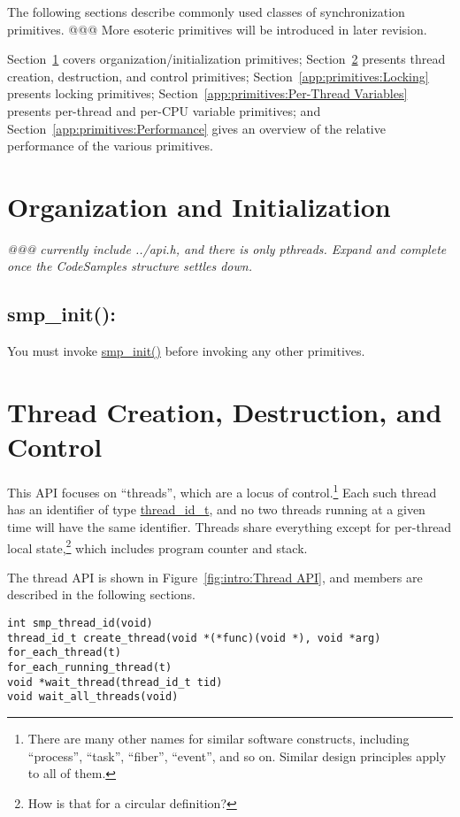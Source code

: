 The following sections describe commonly used classes of synchronization
primitives.
@@@ More esoteric primitives will be introduced in later revision.

Section~\ref{app:primitives:Organization and Initialization}
covers organization/initialization primitives;
Section~\ref{app:primitives:Thread Creation, Destruction, and Control}
presents thread creation, destruction, and control primitives;
Section~\ref{app:primitives:Locking}
presents locking primitives;
Section~\ref{app:primitives:Per-Thread Variables}
presents per-thread and per-CPU variable primitives; and
Section~\ref{app:primitives:Performance}
gives an overview of the relative performance of the various primitives.

\section{Organization and Initialization}
\label{app:primitives:Organization and Initialization}

\emph{@@@ currently include ../api.h, and there is only pthreads.
Expand and complete once the CodeSamples structure settles down.}

\subsection{smp\_init():}
You must invoke \url{smp_init()} before invoking any other primitives.

\section{Thread Creation, Destruction, and Control}
\label{app:primitives:Thread Creation, Destruction, and Control}

This API focuses on ``threads'', which are a locus of control.\footnote{
	There are many other names for similar software constructs, including
	``process'', ``task'', ``fiber'', ``event'', and so on.
	Similar design principles apply to all of them.}
Each such thread has an identifier of type \url{thread_id_t},
and no two threads running at a given time will have the same
identifier.
Threads share everything except for per-thread local state,\footnote{
	How is that for a circular definition?}
which includes program counter and stack.

The thread API is shown in
Figure~\ref{fig:intro:Thread API}, and members are described in the
following sections.

\begin{figure*}[htbp]
{ \scriptsize
\begin{verbatim}
int smp_thread_id(void)
thread_id_t create_thread(void *(*func)(void *), void *arg)
for_each_thread(t)
for_each_running_thread(t)
void *wait_thread(thread_id_t tid)
void wait_all_threads(void)
\end{verbatim}
}
\caption{Thread API}
\label{fig:intro:Thread API}
\end{figure*}

